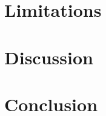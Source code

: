 \documentclass[11pt]{article}
\begin{document}
\section{Limitations}


\section{Discussion}


\section{Conclusion}




\end{document}
